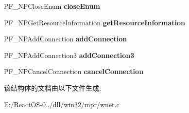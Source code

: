 \begin{DoxyCompactItemize}
P\+F\+\_\+\+N\+P\+Close\+Enum {\bfseries close\+Enum}
\item 
\mbox{\label{struct___w_net_provider_a6835c0f7a14c339143d8e06572bba292}} 
P\+F\+\_\+\+N\+P\+Get\+Resource\+Information {\bfseries get\+Resource\+Information}
\item 
\mbox{\label{struct___w_net_provider_aa7a19a634970b4373dbc9b8c3f593938}} 
P\+F\+\_\+\+N\+P\+Add\+Connection {\bfseries add\+Connection}
\item 
\mbox{\label{struct___w_net_provider_a25b90a90b3aceff3079ebf9356b6d2fe}} 
P\+F\+\_\+\+N\+P\+Add\+Connection3 {\bfseries add\+Connection3}
\item 
\mbox{\label{struct___w_net_provider_a294b2bf5221a2e6d15133818b5a90928}} 
P\+F\+\_\+\+N\+P\+Cancel\+Connection {\bfseries cancel\+Connection}
\end{DoxyCompactItemize}


该结构体的文档由以下文件生成\+:\begin{DoxyCompactItemize}
\item 
E\+:/\+React\+O\+S-\/0../dll/win32/mpr/wnet.\+c\end{DoxyCompactItemize}
